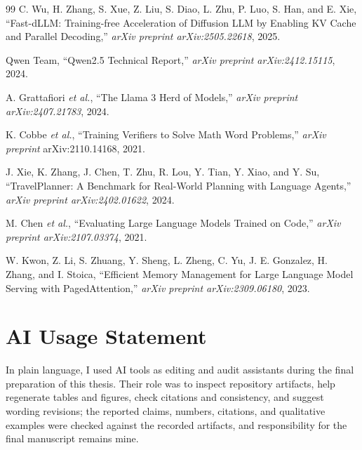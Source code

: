 \documentclass[12pt,a4paper,american,oneside]{scrartcl}
\begin{document}
\begin{thebibliography}{99}
C. Wu, H. Zhang, S. Xue, Z. Liu, S. Diao, L. Zhu, P. Luo, S. Han, and E. Xie,
``Fast-dLLM: Training-free Acceleration of Diffusion LLM by Enabling KV Cache and Parallel Decoding,''
\emph{arXiv preprint arXiv:2505.22618}, 2025.

Qwen Team,
``Qwen2.5 Technical Report,''
\emph{arXiv preprint arXiv:2412.15115}, 2024.

A. Grattafiori \emph{et al.},
``The Llama 3 Herd of Models,''
\emph{arXiv preprint arXiv:2407.21783}, 2024.

K. Cobbe \emph{et al.},
``Training Verifiers to Solve Math Word Problems,''
\emph{arXiv preprint} arXiv:2110.14168, 2021.

J. Xie, K. Zhang, J. Chen, T. Zhu, R. Lou, Y. Tian, Y. Xiao, and Y. Su,
``TravelPlanner: A Benchmark for Real-World Planning with Language Agents,''
\emph{arXiv preprint arXiv:2402.01622}, 2024.

M. Chen \emph{et al.},
``Evaluating Large Language Models Trained on Code,''
\emph{arXiv preprint arXiv:2107.03374}, 2021.

W. Kwon, Z. Li, S. Zhuang, Y. Sheng, L. Zheng, C. Yu, J. E. Gonzalez, H. Zhang, and I. Stoica,
``Efficient Memory Management for Large Language Model Serving with PagedAttention,''
\emph{arXiv preprint arXiv:2309.06180}, 2023.

\end{thebibliography}


\clearpage
{}
\section*{AI Usage Statement}
In plain language, I used AI tools as editing and audit assistants during the final preparation of this thesis. Their role was to inspect repository artifacts, help regenerate tables and figures, check citations and consistency, and suggest wording revisions; the reported claims, numbers, citations, and qualitative examples were checked against the recorded artifacts, and responsibility for the final manuscript remains mine.

\makeAIUsageCard
\restoregeometry
\end{document}
